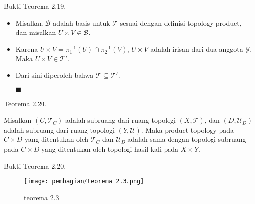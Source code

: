     \begin{frame}{Bukti Teorema 2.19.}
    \begin{tcolorbox}[title=Bukti Teorema 2.19 (2/2)]
    \begin{itemize}
        \item Misalkan $\mathcal{B}$ adalah basis untuk $\mathcal{T}$ sesuai dengan definisi topology product, dan misalkan $U \times V \in \mathcal{B}$. 
        \item Karena $U \times V = \pi_1^{-1}(U) \cap \pi_2^{-1}(V)$, $U \times V$ adalah irisan dari dua anggota $\mathcal{Y}$. Maka $U \times V \in \mathcal{T}'$. 
        \item Dari sini diperoleh bahwa $\mathcal{T} \subseteq \mathcal{T}'$.
    
    \hfill $\blacksquare$
        
    \end{itemize}
        
    \end{tcolorbox}
    \end{frame}
    
    
    \begin{frame}{Teorema 2.20.}
    \begin{tcolorbox}[title=Teorema 2.20]
        Misalkan \((C, \mathcal{T}_C)\) adalah subruang dari ruang topologi \((X, \mathcal{T})\), dan \((D, \mathcal{U}_D)\) adalah subruang dari ruang topologi \((Y, \mathcal{U})\). Maka product topology pada \(C \times D\) yang ditentukan oleh \(\mathcal{T}_C\) dan \(\mathcal{U}_D\) adalah sama dengan topologi subruang pada \(C \times D\) yang ditentukan oleh topologi hasil kali pada \(X \times Y\).
    
    \end{tcolorbox}
    \end{frame}
    
    \begin{frame}{Bukti Teorema 2.20.}
    \begin{figure}
        \centering
        \texttt{[image: pembagian/teorema 2.3.png]}
        \caption{teorema 2.3}
        \label{fig:enter-label}
    \end{figure}
    \end{frame}
    
